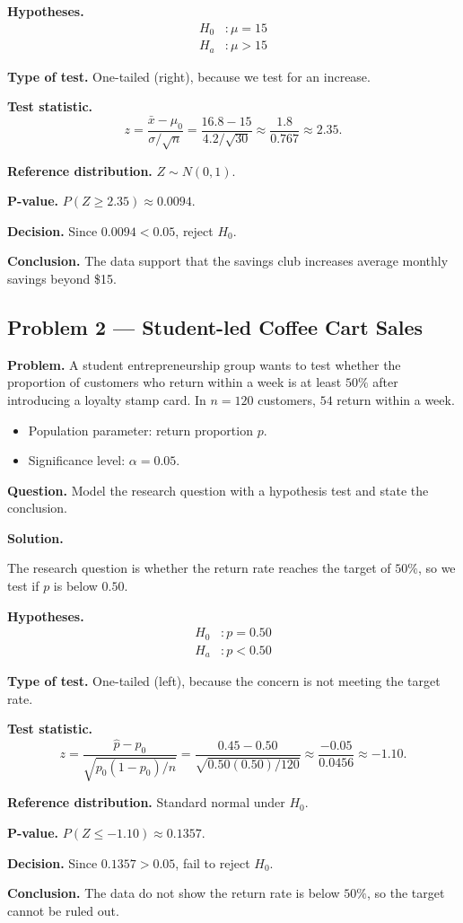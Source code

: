 	\textbf{Hypotheses.}
	\[
	\begin{aligned}
		H_0&: \mu = 15 \\
		H_a&: \mu > 15
	\end{aligned}
	\]
	
	\textbf{Type of test.} One-tailed (right), because we test for an increase.
	
	\textbf{Test statistic.}
	\[
	z = \frac{\bar{x}-\mu_0}{\sigma/\sqrt{n}} = \frac{16.8-15}{4.2/\sqrt{30}} \approx \frac{1.8}{0.767} \approx 2.35.
	\]
	
	\textbf{Reference distribution.} $Z \sim N(0,1)$.
	
	\textbf{P-value.} $P(Z\ge 2.35)\approx 0.0094$.
	
	\textbf{Decision.} Since $0.0094<0.05$, reject $H_0$.
	
	\textbf{Conclusion.} The data support that the savings club increases average monthly savings beyond \$15.
	
	\hypertarget{c10-ex2}{}
	\subsection*{Problem 2 — Student-led Coffee Cart Sales}
	
	\textbf{Problem.} A student entrepreneurship group wants to test whether the proportion of customers who return within a week is at least $50\%$ after introducing a loyalty stamp card. In $n=120$ customers, $54$ return within a week.
	\begin{itemize}
		\item Population parameter: return proportion $p$.
		\item Significance level: $\alpha=0.05$.
	\end{itemize}
	
	\textbf{Question.} Model the research question with a hypothesis test and state the conclusion.
	
	\textbf{Solution.}
	
	The research question is whether the return rate reaches the target of $50\%$, so we test if $p$ is below $0.50$.
	
	\textbf{Hypotheses.}
	\[
	\begin{aligned}
		H_0&: p = 0.50 \\
		H_a&: p < 0.50
	\end{aligned}
	\]
	
	\textbf{Type of test.} One-tailed (left), because the concern is not meeting the target rate.
	
	\textbf{Test statistic.}
	\[
	z = \frac{\hat{p}-p_0}{\sqrt{p_0(1-p_0)/n}} = \frac{0.45-0.50}{\sqrt{0.50(0.50)/120}} \approx \frac{-0.05}{0.0456} \approx -1.10.
	\]
	
	\textbf{Reference distribution.} Standard normal under $H_0$.
	
	\textbf{P-value.} $P(Z\le -1.10)\approx 0.1357$.
	
	\textbf{Decision.} Since $0.1357>0.05$, fail to reject $H_0$.
	
	\textbf{Conclusion.} The data do not show the return rate is below $50\%$, so the target cannot be ruled out.
	
